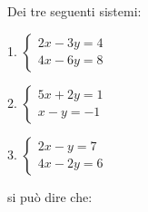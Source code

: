 Dei tre seguenti sistemi:

1. $\displaystyle
\left\{
\begin{array}{l}
\displaystyle 2x - 3y = 4 \\
\displaystyle 4x - 6y = 8
\end{array}
\right.
$

 
2. $\displaystyle
\left\{
\begin{array}{l}
\displaystyle 5x + 2y = 1 \\
\displaystyle x - y = -1
\end{array}
\right.
$

 
3. $\displaystyle
\left\{
\begin{array}{l}
\displaystyle 2x - y = 7 \\
\displaystyle 4x-2y = 6
\end{array}
\right.
$

si può dire che:
